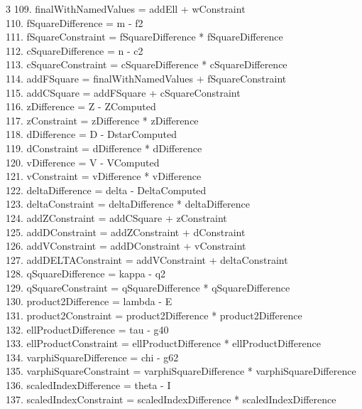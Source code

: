 \documentclass[10pt]{article}
\begin{document}
\begin{multicols}{3}
109. finalWithNamedValues = addEll + wConstraint\\
110. fSquareDifference = m - f2\\
111. fSquareConstraint = fSquareDifference * fSquareDifference\\
112. cSquareDifference = n - c2\\
113. cSquareConstraint = cSquareDifference * cSquareDifference\\
114. addFSquare = finalWithNamedValues + fSquareConstraint\\
115. addCSquare = addFSquare + cSquareConstraint\\
116. zDifference = Z - ZComputed\\
117. zConstraint = zDifference * zDifference\\
118. dDifference = D - DstarComputed\\
119. dConstraint = dDifference * dDifference\\
120. vDifference = V - VComputed\\
121. vConstraint = vDifference * vDifference\\
122. deltaDifference = delta - DeltaComputed\\
123. deltaConstraint = deltaDifference * deltaDifference\\
124. addZConstraint = addCSquare + zConstraint\\
125. addDConstraint = addZConstraint + dConstraint\\
126. addVConstraint = addDConstraint + vConstraint\\
127. addDELTAConstraint = addVConstraint + deltaConstraint\\
128. qSquareDifference = kappa - q2\\
129. qSquareConstraint = qSquareDifference * qSquareDifference\\
130. product2Difference = lambda - E\\
131. product2Constraint = product2Difference * product2Difference\\
132. ellProductDifference = tau - g40\\
133. ellProductConstraint = ellProductDifference * ellProductDifference\\
134. varphiSquareDifference = chi - g62\\
135. varphiSquareConstraint = varphiSquareDifference * varphiSquareDifference\\
136. scaledIndexDifference = theta - I\\
137. scaledIndexConstraint = scaledIndexDifference * scaledIndexDifference\\

\end{multicols}
\end{document}
